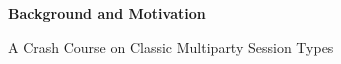 %
\begin{frame}
  \vfill
  \centering
  \begin{sticky}
    {\normalfont \textbf{Background and Motivation}}

    {\normalfont\Large A Crash Course on Classic Multiparty Session Types}
    \par%
  \end{sticky}
  \vfill
\end{frame}


